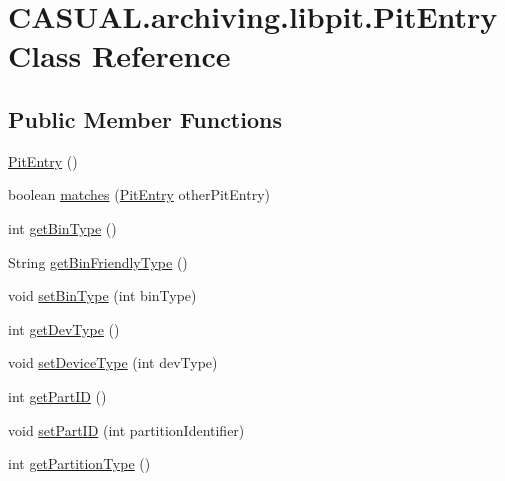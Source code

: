 \hypertarget{class_c_a_s_u_a_l_1_1archiving_1_1libpit_1_1_pit_entry}{\section{C\-A\-S\-U\-A\-L.\-archiving.\-libpit.\-Pit\-Entry Class Reference}
\label{class_c_a_s_u_a_l_1_1archiving_1_1libpit_1_1_pit_entry}
}
\subsection*{Public Member Functions}
\begin{DoxyCompactItemize}
\item 
\hyperlink{class_c_a_s_u_a_l_1_1archiving_1_1libpit_1_1_pit_entry_a7dce9e238989b4c981768ea6c08ba56f}{Pit\-Entry} ()
\item 
boolean \hyperlink{class_c_a_s_u_a_l_1_1archiving_1_1libpit_1_1_pit_entry_a455c8c036ed50b32dbe97a51d63752aa}{matches} (\hyperlink{class_c_a_s_u_a_l_1_1archiving_1_1libpit_1_1_pit_entry}{Pit\-Entry} other\-Pit\-Entry)
\item 
int \hyperlink{class_c_a_s_u_a_l_1_1archiving_1_1libpit_1_1_pit_entry_a9c7cef6888b381fb5d5f39897ee8fa01}{get\-Bin\-Type} ()
\item 
String \hyperlink{class_c_a_s_u_a_l_1_1archiving_1_1libpit_1_1_pit_entry_a4c05687648451db18c7ce8a1462d18ea}{get\-Bin\-Friendly\-Type} ()
\item 
void \hyperlink{class_c_a_s_u_a_l_1_1archiving_1_1libpit_1_1_pit_entry_a77819d3aab0cb6b70e44b12d36797a46}{set\-Bin\-Type} (int bin\-Type)
\item 
int \hyperlink{class_c_a_s_u_a_l_1_1archiving_1_1libpit_1_1_pit_entry_a13406ab3d6569e82b987e286d356c3de}{get\-Dev\-Type} ()
\item 
void \hyperlink{class_c_a_s_u_a_l_1_1archiving_1_1libpit_1_1_pit_entry_a18143ffa6de82880e2b40d435f5936f5}{set\-Device\-Type} (int dev\-Type)
\item 
int \hyperlink{class_c_a_s_u_a_l_1_1archiving_1_1libpit_1_1_pit_entry_a1074e70a4d163f899275f49e83d06caa}{get\-Part\-I\-D} ()
\item 
void \hyperlink{class_c_a_s_u_a_l_1_1archiving_1_1libpit_1_1_pit_entry_a34f52910a0f2033816b50a7c42cf221f}{set\-Part\-I\-D} (int partition\-Identifier)
\item 
int \hyperlink{class_c_a_s_u_a_l_1_1archiving_1_1libpit_1_1_pit_entry_a9c260192a5028ffee6496590d5a773be}{get\-Partition\-Type} ()

\end{DoxyCompactItemize}
